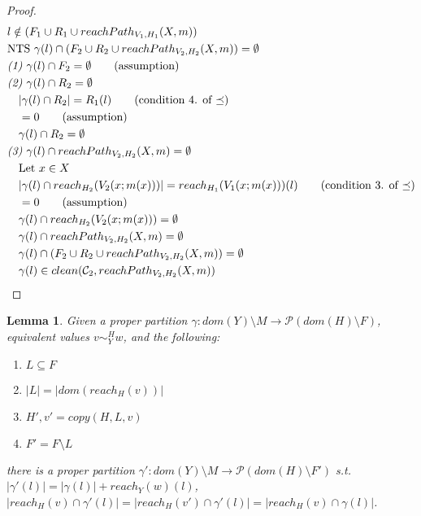\documentclass{easychair}
\newcommand{\veq}[4]{#3 \sim^{#1}_{#2} #4}
\newtheorem{lemma}[theorem]{Lemma}
\theoremstyle{definition}
\begin{document}
\begin{proof}
\begin{align*}
		&l \notin (F_1 \cup R_1 \cup reachPath_{V_1,H_1}(X,m))\\
		&\text{NTS } \gamma(l) \cap (F_2 \cup R_2 \cup reachPath_{V_2,H_2}(X,m)) = \emptyset\\
		&\emph{(1) } \gamma(l) \cap F_2 = \emptyset \tag{assumption}\\
		&\emph{(2) } \gamma(l) \cap R_2 = \emptyset\\
		&\quad |\gamma(l) \cap R_2| = R_1(l) \tag{condition 4. of $\preceq$}\\ 
		&\quad = 0 \tag{assumption}\\
		&\quad \gamma(l) \cap R_2 = \emptyset\\
		&\emph{(3) } \gamma(l) \cap reachPath_{V_2,H_2}(X,m) = \emptyset\\
		&\quad \text{Let } x \in X\\
		&\quad |\gamma(l) \cap reach_{H_2}(V_2(x;m(x)))| = reach_{H_1}(V_1(x;m(x)))(l) 
			\tag{condition 3. of $\preceq$}\\
		&\quad = 0 \tag{assumption}\\
		&\quad\gamma(l) \cap reach_{H_2}(V_2(x;m(x))) = \emptyset\\
		&\quad\gamma(l) \cap reachPath_{V_2,H_2}(X,m) = \emptyset\\
		&\quad\gamma(l) \cap (F_2 \cup R_2 \cup reachPath_{V_2,H_2}(X,m)) = \emptyset\\
		&\quad\gamma(l) \in clean(\mathcal{C}_2,reachPath_{V_2,H_2}(X,m))
	\end{align*}
\end{proof}

\begin{lemma}\label{itm:copyRel}
	Given  a proper partition $\gamma : dom(Y) \setminus M \to \mathcal{P}(dom(H)\setminus F)$, 
	equivalent values $\veq{H}{Y}{v}{w}$, and the 
	following:
	\begin{enumerate}
		\item $L \subseteq F$
		\item $|L| = |dom(reach_H(v))|$
		\item $H',v' = copy(H,L,v)$
		\item $F' =	F \setminus L$
	\end{enumerate}
	there is a proper partition $\gamma' : dom(Y) \setminus M \to \mathcal{P}(dom(H) \setminus F')$ 
	s.t.
	$|\gamma'(l)| = |\gamma(l)| + reach_Y(w)(l)$, 
	$|reach_H(v) \cap \gamma'(l)| = |reach_H(v') \cap \gamma'(l)| = |reach_H(v) \cap \gamma(l)|$.
\end{lemma}
\end{document}
